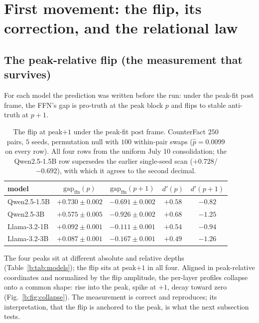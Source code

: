 \documentclass[11pt]{article}
\begin{document}
\section{First movement: the flip, its correction, and the relational law}
\label{b:sec:flip}

\subsection{The peak-relative flip (the measurement that survives)}

For each model the prediction was written before the run: under the
peak-fit post frame, the FFN's gap is pro-truth at the peak block $p$ and
flips to stable anti-truth at $p{+}1$.

\begin{table}[H]
\centering
\caption{The flip at peak$+1$ under the peak-fit post frame. CounterFact
$250$ pairs, $5$ seeds, permutation null with $100$ within-pair swaps
($\hat p = 0.0099$ on every row). All four rows from the uniform July 10
consolidation; the Qwen2.5-1.5B row supersedes the earlier single-seed scan
($+0.728$/$-0.692$), with which it agrees to the second decimal.}
\label{b:tab:flip}
\begin{tabular}{lcccc}
\toprule
model & $\mathrm{gap}_{\mathrm{ffn}}(p)$ & $\mathrm{gap}_{\mathrm{ffn}}(p{+}1)$ & $d'(p)$ & $d'(p{+}1)$ \\
\midrule
Qwen2.5-1.5B & $+0.730 \pm 0.002$ & $-0.691 \pm 0.002$ & $+0.58$ & $-0.82$ \\
Qwen2.5-3B   & $+0.575 \pm 0.005$ & $-0.926 \pm 0.002$ & $+0.68$ & $-1.25$ \\
Llama-3.2-1B & $+0.092 \pm 0.001$ & $-0.111 \pm 0.001$ & $+0.54$ & $-0.94$ \\
Llama-3.2-3B & $+0.087 \pm 0.001$ & $-0.167 \pm 0.001$ & $+0.49$ & $-1.26$ \\
\bottomrule
\end{tabular}
\end{table}

The four peaks sit at different absolute and relative depths
(Table~\ref{b:tab:models}); the flip sits at peak$+1$ in all four. Aligned in
peak-relative coordinates and normalized by the flip amplitude, the
per-layer profiles collapse onto a common shape: rise into the peak, spike
at $+1$, decay toward zero (Fig.~\ref{b:fig:collapse}). The measurement is
correct and reproduces; its interpretation, that the flip is anchored to
the peak, is what the next subsection tests.
\end{document}
